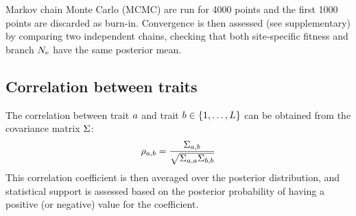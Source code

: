 \documentclass{MBE}
\begin{document}
	Markov chain Monte Carlo (MCMC) are run for 4000 points and the first 1000 points are discarded as burn-in.
	Convergence is then assessed (see supplementary) by comparing two independent chains, checking that both site-specific fitness and branch $N_{\text{e}}$ have the same posterior mean.

	\subsection{Correlation between traits}
	\label{sec:Correlation}
	The correlation between trait $a$ and trait $b \in \{1, \hdots, L\}$ can be obtained from the covariance matrix $\Sigma$:
	\begin{equation}
		\rho_{a, b} = \dfrac{\Sigma_{a, b}}{\sqrt{\Sigma_{a, a} \Sigma_{b, b}}}
	\end{equation}
	This correlation coefficient is then averaged over the posterior distribution, and statistical support is assessed based on the posterior probability of having a positive (or negative) value for the coefficient.
\end{document}
